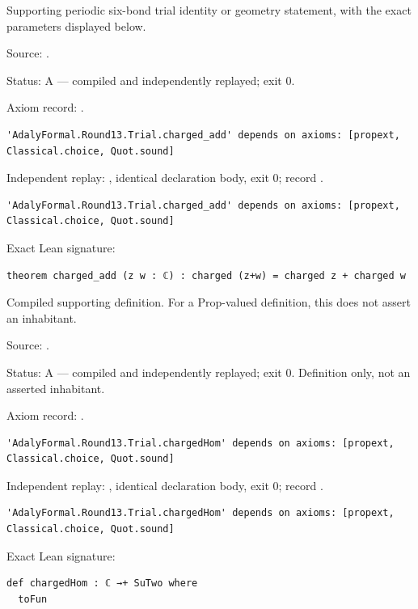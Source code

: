 \begin{theorem}[bp-412]
\label{bp-412}
\leanok
Supporting periodic six-bond trial identity or geometry statement, with the exact parameters displayed below.

\par Source: \texttt{}.
\par Status: A — compiled and independently replayed; exit 0.
\par Axiom record: \texttt{}.
\begin{verbatim}
'AdalyFormal.Round13.Trial.charged_add' depends on axioms: [propext, Classical.choice, Quot.sound]
\end{verbatim}
\par Independent replay: \texttt{}, identical declaration body, exit 0; record \texttt{}.
\begin{verbatim}
'AdalyFormal.Round13.Trial.charged_add' depends on axioms: [propext, Classical.choice, Quot.sound]
\end{verbatim}
\par Exact Lean signature:
\begin{verbatim}
theorem charged_add (z w : ℂ) : charged (z+w) = charged z + charged w
\end{verbatim}
\end{theorem}

\begin{definition}[bp-413]
\label{bp-413}
\leanok
Compiled supporting definition. For a Prop-valued definition, this does not assert an inhabitant.

\par Source: \texttt{}.
\par Status: A — compiled and independently replayed; exit 0. Definition only, not an asserted inhabitant.
\par Axiom record: \texttt{}.
\begin{verbatim}
'AdalyFormal.Round13.Trial.chargedHom' depends on axioms: [propext, Classical.choice, Quot.sound]
\end{verbatim}
\par Independent replay: \texttt{}, identical declaration body, exit 0; record \texttt{}.
\begin{verbatim}
'AdalyFormal.Round13.Trial.chargedHom' depends on axioms: [propext, Classical.choice, Quot.sound]
\end{verbatim}
\par Exact Lean signature:
\begin{verbatim}
def chargedHom : ℂ →+ SuTwo where
  toFun
\end{verbatim}
\end{definition}

